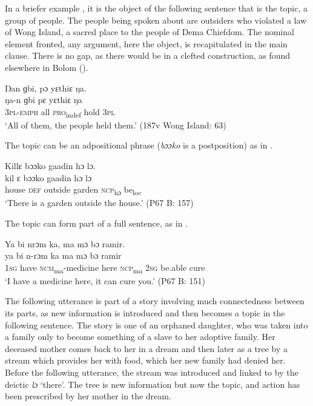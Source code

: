 In a briefer example , it is the object of the following sentence that is the topic, a group of people. The people being spoken about are outsiders who violated a law of Wong Island, a sacred place to the people of Dema Chiefdom. The nominal element fronted, any argument, here the object, is recapitulated in the main clause. There is no gap, as there would be in a clefted construction, as found elsewhere in Bolom (\citealt{Childs1997}).

\ea%
    \label{ex:225}

    Ŋan ɡbi, pɔ yɛthiɛ   ŋa.\\
    \gll ŋa-n      ɡbi  pɛ      yɛthiɛ    ŋa\\
    \textsc{3pl-emph}  all    \textsc{pro}\textsubscript{indef}  hold    \textsc{3pl}\\
    \glt ‘All of them, the people held them.' (187v Wong Island: 63)
\z

The topic can be an adpositional phrase (\textit{bɔɔko} is a postposition) as in .

\ea%
    \label{ex:226}
    Killɛ bɔɔko gaadin hɔ lɔ.\\
    \gll kil      ɛ    bɔɔko    gaadin  hɔ      lɔ\\
    house    \textsc{def}  outside  garden  \textsc{ncp}\textsubscript{hɔ}    be\textsubscript{loc}\\
    \glt ‘There is a garden outside the house.' (P67 B: 157)
\z

The topic can form part of a full sentence, as in .

\ea%
    \label{ex:227}
    Ya bi nrɔm ka, ma mɔ bɔ ramir.\\
    \gll ya    bi    n-rɔm          ka    ma    mɔ  bɔ      ramir\\
    \textsc{1sg}  have  \textsc{ncm}\textsubscript{ma}{}-medicine  here  \textsc{ncp}\textsubscript{ma}    \textsc{2sg}  be.able  cure\\
    \glt ‘‎I have a medicine here, it can cure you.' (P67 B: 151)
\z

The following utterance is part of a story involving much connectedness between its parts, as new information is introduced and then becomes a topic in the following sentence. The story is one of an orphaned daughter, who was taken into a family only to become something of a slave to her adoptive family. Her deceased mother comes back to her in a dream and then later as a tree by a stream which provides her with food, which her new family had denied her. Before the following utterance, the stream was introduced and linked to  by the deictic \textit{lɔ} ‘there'. The tree is new information but now the topic, and action has been prescribed by her mother in the dream.

